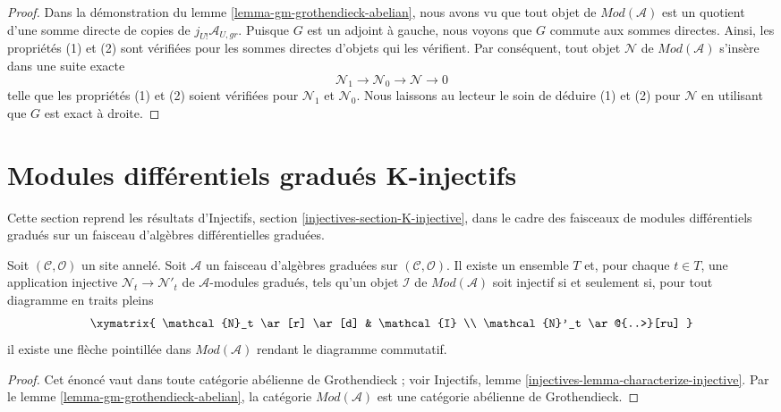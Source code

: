 \begin{proof}
\medskip\noindent Dans
la démonstration du lemme \ref{lemma-gm-grothendieck-abelian},
nous avons vu que tout objet de
$\textit{Mod}(\mathcal{A})$ est un quotient d'une somme directe de copies
de $j_{U!}\mathcal{A}_{U, gr}$. Puisque $G$ est un adjoint à gauche,
nous voyons que $G$ commute aux sommes directes. Ainsi, les
propriétés (1) et (2) sont vérifiées pour les sommes directes
d'objets qui les vérifient. Par conséquent, tout objet $\mathcal{N}$ de
$\textit{Mod}(\mathcal{A})$ s'insère dans une suite exacte
$$
\mathcal{N}_1 \to \mathcal{N}_0 \to \mathcal{N} \to 0
$$ telle que les propriétés
(1) et (2) soient vérifiées pour $\mathcal{N}_1$ et $\mathcal{N}_0$. Nous
laissons au lecteur le soin de déduire (1) et (2) pour
$\mathcal{N}$ en utilisant que $G$ est exact à droite.
\end{proof}









\section{Modules différentiels gradués K-injectifs}
\label{section-K-injective}

\noindent
Cette section reprend les résultats
d'Injectifs, section \ref{injectives-section-K-injective},
dans le cadre des faisceaux de modules différentiels gradués sur
un faisceau d'algèbres différentielles graduées.

\begin{lemma}
\label{lemma-characterize-injectives} Soit
$(\mathcal{C}, \mathcal{O})$ un site annelé. Soit $\mathcal{A}$ un faisceau
d'algèbres graduées sur $(\mathcal{C}, \mathcal{O})$. Il existe un
ensemble $T$ et, pour chaque $t \in T$, une application injective
$\mathcal{N}_t \to \mathcal{N}'_t$ de $\mathcal{A}$-modules gradués, tels qu'un
objet $\mathcal{I}$ de $\textit{Mod}(\mathcal{A})$ soit injectif si et
seulement si, pour tout diagramme en traits pleins
$$
\xymatrix{
\mathcal{N}_t \ar[r] \ar[d] & \mathcal{I} \\
\mathcal{N}'_t \ar@{..>}[ru]
}
$$ il existe
une flèche pointillée dans $\textit{Mod}(\mathcal{A})$ rendant le diagramme commutatif.
\end{lemma}

\begin{proof}
Cet énoncé vaut dans toute catégorie abélienne de Grothendieck ;
voir Injectifs, lemme \ref{injectives-lemma-characterize-injective}.
Par le lemme \ref{lemma-gm-grothendieck-abelian}, la catégorie
$\textit{Mod}(\mathcal{A})$ est une catégorie abélienne de Grothendieck.
\end{proof}

